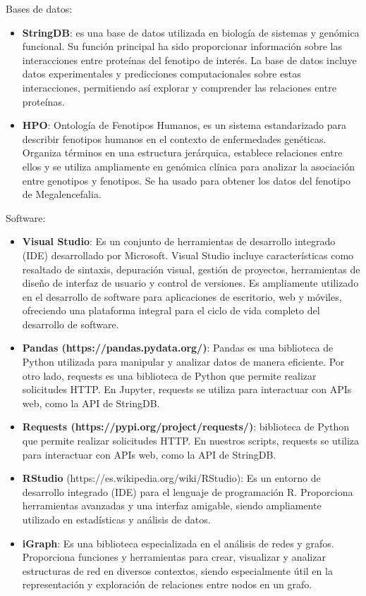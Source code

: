 Bases de datos:
\begin{itemize}
	\item \textbf{StringDB}: es una base de datos utilizada en biología de sistemas y genómica funcional. Su función principal ha sido proporcionar información sobre las interacciones entre proteínas del fenotipo de interés. La base de datos incluye datos experimentales y predicciones computacionales sobre estas interacciones, permitiendo así explorar y comprender las relaciones entre proteínas.
	\item \textbf{HPO}: Ontología de Fenotipos Humanos, es un sistema estandarizado para describir fenotipos humanos en el contexto de enfermedades genéticas. Organiza términos en una estructura jerárquica, establece relaciones entre ellos y se utiliza ampliamente en genómica clínica para analizar la asociación entre genotipos y fenotipos. Se ha usado para obtener los datos del fenotipo de Megalencefalia.
\end{itemize}


Software:
\begin{itemize}
	\item \textbf{Visual Studio}: Es un conjunto de herramientas de desarrollo integrado (IDE) desarrollado por Microsoft. Visual Studio incluye características como resaltado de sintaxis, depuración visual, gestión de proyectos, herramientas de diseño de interfaz de usuario y control de versiones. Es ampliamente utilizado en el desarrollo de software para aplicaciones de escritorio, web y móviles, ofreciendo una plataforma integral para el ciclo de vida completo del desarrollo de software.
	\item \textbf{Pandas (https://pandas.pydata.org/)}: Pandas es una biblioteca de Python utilizada para manipular y analizar datos de manera eficiente. Por otro lado, requests es una biblioteca de Python que permite realizar solicitudes HTTP. En Jupyter, requests se utiliza para interactuar con APIs web, como la API de StringDB.
	\item \textbf{Requests (https://pypi.org/project/requests/)}: biblioteca de Python que permite realizar solicitudes HTTP. En nuestros scripts, requests se utiliza para interactuar con APIs web, como la API de StringDB.
	\item \textbf{RStudio} (https://es.wikipedia.org/wiki/RStudio): Es un entorno de desarrollo integrado (IDE) para el lenguaje de programación R. Proporciona herramientas avanzadas y una interfaz amigable, siendo ampliamente utilizado en estadísticas y análisis de datos.
	\item \textbf{iGraph}: Es una biblioteca especializada en el análisis de redes y grafos. Proporciona funciones y herramientas para crear, visualizar y analizar estructuras de red en diversos contextos, siendo especialmente útil en la representación y exploración de relaciones entre nodos en un grafo.
\end{itemize}


